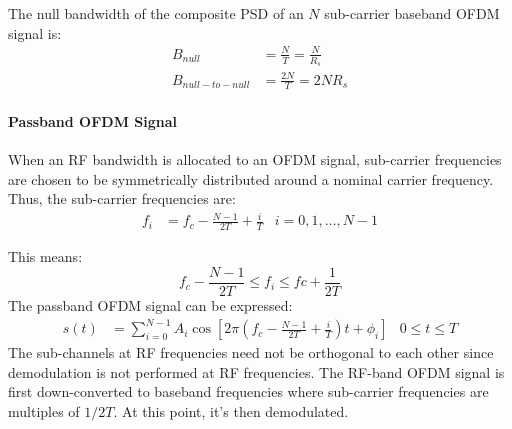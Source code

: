 The null bandwidth of the composite \gls{PSD} of an \(N\) sub-carrier baseband OFDM signal is:
\begin{align}
	B_{null} &= \frac{N}{T} = \frac{N}{R_s} \\
	B_{null-to-null} &= \frac{2N}{T} = 2NR_s
\end{align}

\paragraph{Passband OFDM Signal}

When an \gls{RF} bandwidth is allocated to an OFDM signal, sub-carrier frequencies are chosen to be symmetrically distributed around a nominal carrier frequency. Thus, the sub-carrier frequencies are:
\begin{align}
	f_i &= f_c - \frac{N-1}{2T} + \frac{i}{T} & i = 0,1,\ldots,N-1
\end{align}
\begin{mathDef}
\end{mathDef}
This means:
\begin{equation}
	f_c - \frac{N-1}{2T} \leq f_i \leq fc + \frac{1}{2T}
\end{equation}
The passband OFDM signal can be expressed:
\begin{align}
	s(t) &= \sum_{i=0}^{N-1} A_i \cos \left[ 2\pi \left( f_c - \frac{N-1}{2T} + \frac{i}{T}\right)t + \phi_i \right] & 0 \leq t \leq T
\end{align}
The sub-channels at \gls{RF} frequencies need not be orthogonal to each other since demodulation is not performed at RF frequencies\cite{fuqin}. The RF-band OFDM signal is first down-converted to baseband frequencies where sub-carrier frequencies are multiples of \(1/2T\)\cite{fuqin}. At this point, it's then demodulated.

